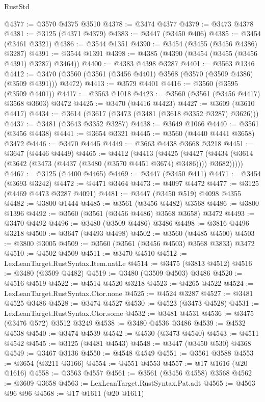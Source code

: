\begin{lexlean}{RustStd}
\begin{coremodule}
@4377 := @3570 @4375 @3510
@4378 := @3474 @4377
@4379 := @3473 @4378
@4381 := @3125 (@4371 @4379)
@4383 := @3447 (@3450 @406)
@4385 := @3454 (@3461 @3321)
@4386 := @3544 @1351
@4390 := @3454 (@3455 (@3456 @4386) @3287)
@4391 := @3544 @1391
@4398 := @4385 (@4390 (@3454 (@3455 (@3456 @4391) @3287) @3464))
@4400 := @4383 @4398 @3287
@4401 := @3563 @1346
@4412 := @3470 (@3560 (@3561 (@3456 @4401) @3568 (@3570 (@3509 @4386) (@3509 @4391))) @3472)
@4413 := @3579 @4401
@4416 := @3560 (@3595 (@3509 @4401))
@4417 := @3563 @1018
@4423 := @3560 (@3561 (@3456 @4417) @3568 @3603) @3472
@4425 := @3470 (@4416 @4423)
@4427 := @3609 (@3610 @4417)
@4434 := @3614 (@3617 (@3473 (@3481 (@3618 @3352 @3287) @3626)))
@4437 := @3481 (@3643 @3352 @3287)
@4438 := @3649 @1066
@4440 := @3561 (@3456 @4438)
@4441 := @3654 @3321
@4445 := @3560 (@4440 @4441 @3658) @3472
@4446 := @3470 @4445
@4449 := @3663 @4438 @3668 @3218
@4451 := @3647 (@4446 @4449)
@4465 := @4412
    (@4413
      (@4425
        (@4427 (@4434 (@3614 (@3642 (@3473 (@4437 (@3480 (@3570 @4451 @3674) @3486)))) @3682)))))
@4467 := @3125 (@4400 @4465)
@4469 := @3447 (@3450 @411)
@4471 := @3454 (@3693 @3242)
@4472 := @4471 @3464
@4473 := @4097 @4472
@4477 := @3125 (@4469 @4473 @3287 @4091)
@4481 := @3447 (@3450 @519) @4098 @4355
@4482 := @3800 @1444
@4485 := @3561 (@3456 @4482) @3568
@4486 := @3800 @1396
@4492 := @3560 (@3561 (@3456 @4486) @3568 @3658) @3472
@4493 := @3470 @4492
@4496 := @3480 (@3509 @4486) @3486
@4498 := @3816 @4496 @3218
@4500 := @3647 (@4493 @4498)
@4502 := @3560 (@4485 @4500)
@4503 := @3800 @3005
@4509 := @3560 (@3561 (@3456 @4503) @3568 @3833) @3472
@4510 := @4502 @4509
@4511 := @3470 @4510
@4512 := LexLeanTarget.RustSyntax.Item.natLe
@4514 := @3475 (@3813 @4512)
@4516 := @3480 (@3509 @4482)
@4519 := @3480 (@3509 @4503) @3486
@4520 := @4516 @4519
@4522 := @4514 @4520 @3218
@4523 := @4265 @4522
@4524 := LexLeanTarget.RustSyntax.Ctor.none
@4525 := @4524 @3287
@4527 := @3481 @4525 @3486
@4528 := @3474 @4527
@4530 := @4523 (@3473 @4528)
@4531 := LexLeanTarget.RustSyntax.Ctor.some
@4532 := @3481 @4531
@4536 := @3475 (@3476 @572) @3512 @3249
@4538 := @3480 @4536 @3486
@4539 := @4532 @4538
@4540 := @3474 @4539
@4542 := @4530 (@3473 @4540)
@4543 := @4511 @4542
@4545 := @3125 (@4481 @4543)
@4548 := @3447 (@3450 @530) @4368
@4549 := @3467 @3136
@4550 := @4548 @4549
@4551 := @3561 @3588
@4553 := @3654 (@3211 @3166)
@4554 := @4551 @4553
@4557 := @17 @1616 (@20 @1616)
@4558 := @3563 @4557
@4561 := @3561 (@3456 @4558) @3568
@4562 := @3609 @3658
@4563 := LexLeanTarget.RustSyntax.Pat.adt
@4565 := @4563 @96 @96
@4568 := @17 @1611 (@20 @1611)

\end{coremodule}
\end{lexlean}

